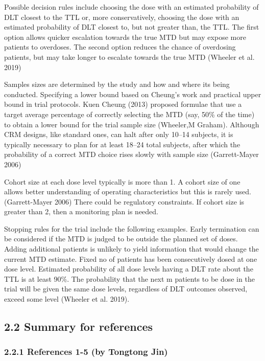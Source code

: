 \documentclass[
]{article}
\begin{document}
Possible decision rules include choosing the dose with an estimated
probability of DLT closest to the TTL or, more conservatively, choosing
the dose with an estimated probability of DLT closest to, but not
greater than, the TTL. The first option allows quicker escalation
towards the true MTD but may expose more patients to overdoses. The
second option reduces the chance of overdosing patients, but may take
longer to escalate towards the true MTD (Wheeler et al. 2019)

Samples sizes are determined by the study and how and where its being
conducted. Specifying a lower bound based on Cheung's work and practical
upper bound in trial protocols. Kuen Cheung (2013) proposed formulae
that use a target average percentage of correctly selecting the MTD
(say, 50\% of the time) to obtain a lower bound for the trial sample
size (Wheeler,M Graham). Although CRM designs, like standard ones, can
halt after only 10--14 subjects, it is typically necessary to plan for
at least 18--24 total subjects, after which the probability of a correct
MTD choice rises slowly with sample size (Garrett-Mayer 2006)

Cohort size at each dose level typically is more than 1. A cohort size
of one allows better understanding of operating characteristics but this
is rarely used. (Garrett-Mayer 2006) There could be regulatory
constraints. If cohort size is greater than 2, then a monitoring plan is
needed.

Stopping rules for the trial include the following examples. Early
termination can be considered if the MTD is judged to be outside the
planned set of doses. Adding additional patients is unlikely to yield
information that would change the current MTD estimate. Fixed no of
patients has been consecutively dosed at one dose level. Estimated
probability of all dose levels having a DLT rate about the TTL is at
least 90\%. The probability that the next m patients to be dose in the
trial will be given the same dose levels, regardless of DLT outcomes
observed, exceed some level (Wheeler et al. 2019).

\hypertarget{summary-for-references}{%
\subsection{2.2 Summary for references}\label{summary-for-references}}

\hypertarget{references-1-5-by-tongtong-jin}{%
\subsubsection{2.2.1 References 1-5 (by Tongtong
Jin)}\label{references-1-5-by-tongtong-jin}}
\end{document}
